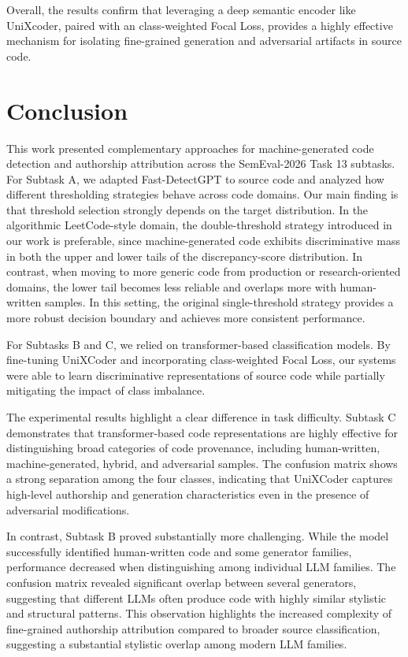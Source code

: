 \documentclass[11pt]{article}
\begin{document}
Overall, the results confirm that leveraging a deep semantic encoder like UniXcoder, paired with an class-weighted Focal Loss, provides a highly effective mechanism for isolating fine-grained generation and adversarial artifacts in source code.

\section{Conclusion}

This work presented complementary approaches for machine-generated code detection and authorship attribution across the SemEval-2026 Task 13 subtasks. For Subtask A, we adapted Fast-DetectGPT to source code and analyzed how different thresholding strategies behave across code domains. Our main finding is that threshold selection strongly depends on the target distribution. In the algorithmic LeetCode-style domain, the double-threshold strategy introduced in our work is preferable, since machine-generated code exhibits discriminative mass in both the upper and lower tails of the discrepancy-score distribution. In contrast, when moving to more generic code from production or research-oriented domains, the lower tail becomes less reliable and overlaps more with human-written samples. In this setting, the original single-threshold strategy provides a more robust decision boundary and achieves more consistent performance.

For Subtasks B and C, we relied on transformer-based classification models. By fine-tuning UniXCoder and incorporating class-weighted Focal Loss, our systems were able to learn discriminative representations of source code while partially mitigating the impact of class imbalance.

The experimental results highlight a clear difference in task difficulty. Subtask C demonstrates that transformer-based code representations are highly effective for distinguishing broad categories of code provenance, including human-written, machine-generated, hybrid, and adversarial samples. The confusion matrix shows a strong separation among the four classes, indicating that UniXCoder captures high-level authorship and generation characteristics even in the presence of adversarial modifications.

In contrast, Subtask B proved substantially more challenging. While the model successfully identified human-written code and some generator families, performance decreased when distinguishing among individual LLM families. The confusion matrix revealed significant overlap between several generators, suggesting that different LLMs often produce code with highly similar stylistic and structural patterns. This observation highlights the increased complexity of fine-grained authorship attribution compared to broader source classification, suggesting a substantial stylistic overlap among modern LLM families.
\end{document}
